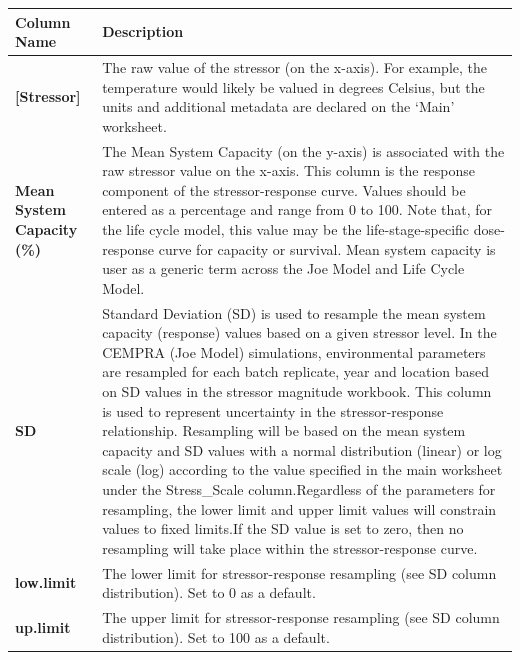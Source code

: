 \documentclass[
  letterpaper,
  DIV=11,
  numbers=noendperiod]{scrreprt}
\begin{document}
\begin{longtable}[]{@{}
  >{\raggedright\arraybackslash}p{}
  >{\raggedright\arraybackslash}p{}@{}}
\toprule\noalign{}
\begin{minipage}[b]{\linewidth}\raggedright
Column Name
\end{minipage} & \begin{minipage}[b]{\linewidth}\raggedright
Description
\end{minipage} \\
\midrule\noalign{}
\endhead
\bottomrule\noalign{}
\endlastfoot
\textbf{{[}Stressor{]}} & The raw value of the stressor (on the x-axis).
For example, the temperature would likely be valued in degrees Celsius,
but the units and additional metadata are declared on the `Main'
worksheet. \\
\textbf{Mean System Capacity (\%)} & The Mean System Capacity (on the
y-axis) is associated with the raw stressor value on the x-axis. This
column is the response component of the stressor-response curve. Values
should be entered as a percentage and range from 0 to 100. Note that,
for the life cycle model, this value may be the life-stage-specific
dose-response curve for capacity or survival. Mean system capacity is
user as a generic term across the Joe Model and Life Cycle Model. \\
\textbf{SD} & Standard Deviation (SD) is used to resample the mean
system capacity (response) values based on a given stressor level. In
the CEMPRA (Joe Model) simulations, environmental parameters are
resampled for each batch replicate, year and location based on SD values
in the stressor magnitude workbook. This column is used to represent
uncertainty in the stressor-response relationship. Resampling will be
based on the mean system capacity and SD values with a normal
distribution (linear) or log scale (log) according to the value
specified in the main worksheet under the Stress\_Scale
column.Regardless of the parameters for resampling, the lower limit and
upper limit values will constrain values to fixed limits.If the SD value
is set to zero, then no resampling will take place within the
stressor-response curve. \\
\textbf{low.limit} & The lower limit for stressor-response resampling
(see SD column distribution). Set to 0 as a default. \\
\textbf{up.limit} & The upper limit for stressor-response resampling
(see SD column distribution). Set to 100 as a default. \\
\end{longtable}
\end{document}
